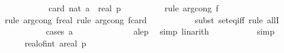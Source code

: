 \begin{isabellebody}
\ \ \ \ \ \ \isamarkupfalse%
\ \isamarkupfalse%
\ {\isachardoublequoteopen}{\isachardot}{\kern0pt}{\isachardot}{\kern0pt}{\isachardot}{\kern0pt}\ {\isacharequal}{\kern0pt}\ card\ {\isacharbraceleft}{\kern0pt}{}{\isachardot}{\kern0pt}{\isachardot}{\kern0pt}{\isacharless}{\kern0pt}nat\ {\isacharparenleft}{\kern0pt}a{\isacharplus}{\kern0pt}{}{\isacharparenright}{\kern0pt}{\isacharbraceright}{\kern0pt}\ {\isacharslash}{\kern0pt}\ real\ p{\isachardoublequoteclose}\isanewline
\ \ \ \ \ \ \ \ \isamarkupfalse%
\ {\isacharparenleft}{\kern0pt}rule\ arg{\isacharunderscore}{\kern0pt}cong{}{\isacharbrackleft}{\kern0pt}\ f{\isacharequal}{\kern0pt}{\isachardoublequoteopen}{\isacharparenleft}{\kern0pt}{\isacharslash}{\kern0pt}{\isacharparenright}{\kern0pt}{\isachardoublequoteclose}{\isacharbrackright}{\kern0pt}{\isacharparenright}{\kern0pt}\isanewline
\ \ \ \ \ \ \ \ \ \isamarkupfalse%
\ {\isacharparenleft}{\kern0pt}rule\ arg{\isacharunderscore}{\kern0pt}cong{\isacharbrackleft}{\kern0pt}\ f{\isacharequal}{\kern0pt}{\isachardoublequoteopen}real{\isachardoublequoteclose}{\isacharbrackright}{\kern0pt}{\isacharcomma}{\kern0pt}\ rule\ arg{\isacharunderscore}{\kern0pt}cong{\isacharbrackleft}{\kern0pt}\ f{\isacharequal}{\kern0pt}{\isachardoublequoteopen}card{\isachardoublequoteclose}{\isacharbrackright}{\kern0pt}{\isacharparenright}{\kern0pt}\isanewline
\ \ \ \ \ \ \ \ \ \isamarkupfalse%
\ {\isacharparenleft}{\kern0pt}subst\ set{\isacharunderscore}{\kern0pt}eq{\isacharunderscore}{\kern0pt}iff{\isacharcomma}{\kern0pt}\ rule\ allI{\isacharparenright}{\kern0pt}\isanewline
\ \ \ \ \ \ \ \ \ \isamarkupfalse%
\ {\isacharparenleft}{\kern0pt}cases\ {\isachardoublequoteopen}a\ {\isasymge}\ {}{\isachardoublequoteclose}{\isacharparenright}{\kern0pt}\isanewline
\ \ \ \ \ \ \ \ \ \ \isamarkupfalse%
\ a{\isacharunderscore}{\kern0pt}le{\isacharunderscore}{\kern0pt}p\ \isamarkupfalse%
\ {\isacharparenleft}{\kern0pt}simp{\isacharcomma}{\kern0pt}\ linarith{\isacharparenright}{\kern0pt}\ \isanewline
\ \ \ \ \ \ \ \ \isamarkupfalse%
\ simp{\isacharplus}{\kern0pt}\isanewline
\ \ \ \ \ \ \isamarkupfalse%
\ \isamarkupfalse%
\ {\isachardoublequoteopen}{\isachardot}{\kern0pt}{\isachardot}{\kern0pt}{\isachardot}{\kern0pt}\ {\isacharequal}{\kern0pt}\ \ {\isacharparenleft}{\kern0pt}real{\isacharunderscore}{\kern0pt}of{\isacharunderscore}{\kern0pt}int\ a{\isacharplus}{\kern0pt}{}{\isacharparenright}{\kern0pt}{\isacharslash}{\kern0pt}real\ p{\isachardoublequoteclose}\isanewline

\end{isabellebody}

